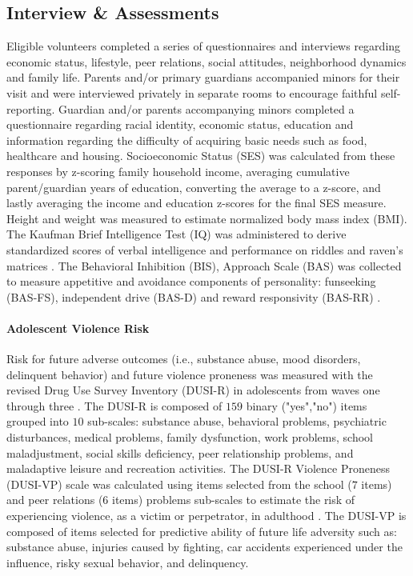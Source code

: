 \documentclass[utf8]{article}
\begin{document}
\subsection*{Interview \& Assessments}
Eligible volunteers completed a series of questionnaires and interviews regarding economic status, lifestyle, peer relations, social attitudes, neighborhood dynamics and family life. Parents and/or primary guardians accompanied minors for their visit and were interviewed privately in separate rooms to encourage faithful self-reporting. Guardian and/or parents accompanying minors completed a questionnaire regarding racial identity, economic status, education and information regarding the difficulty of acquiring basic needs such as food, healthcare and housing. Socioeconomic Status (SES) was calculated from these responses by z-scoring family household income, averaging cumulative parent/guardian years of education, converting the average to a z-score, and lastly averaging the income and education z-scores for the final SES measure. Height and weight was measured to estimate normalized body mass index (BMI). The Kaufman Brief Intelligence Test (IQ) was administered to derive standardized scores of verbal intelligence and performance on riddles and raven’s matrices \citep{kaufman2004kaufman}. The Behavioral Inhibition (BIS), Approach Scale (BAS) was collected to measure appetitive and avoidance components of personality:  funseeking (BAS-FS), independent drive (BAS-D) and reward responsivity (BAS-RR) \citep{carver1994behavioral}.
\paragraph{Adolescent Violence Risk} 
Risk for future adverse outcomes (i.e., substance abuse, mood disorders, delinquent behavior) and future violence proneness was measured with the revised Drug Use Survey Inventory (DUSI-R) in adolescents from waves one through three  \citep*{tarter1994reliability}. The DUSI-R is composed of $159$ binary ("yes","no") items grouped into $10$ sub-scales: substance abuse, behavioral problems, psychiatric disturbances, medical problems, family dysfunction, work problems, school maladjustment, social skills deficiency, peer relationship problems, and maladaptive leisure and recreation activities. The DUSI-R Violence Proneness (DUSI-VP) scale was calculated using items selected from the school ($7$ items) and peer relations ($6$ items) problems sub-scales to estimate the risk of experiencing violence, as a victim or perpetrator, in adulthood \citep*{kirisci2009violence}. The DUSI-VP is composed of items selected for predictive ability of future life adversity such as: substance abuse, injuries caused by fighting, car accidents experienced under the influence, risky sexual behavior, and delinquency.
\end{document}
